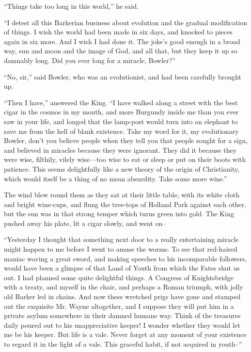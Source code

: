 \documentclass{book}
\begin{document}
“Things take too long in this world,” he said.

“I detest all this Barkerian business about evolution and the gradual modification of things. I wish the world had been made in six days, and knocked to pieces again in six more. And I wish I had done it. The joke’s good enough in a broad way, sun and moon and the image of God, and all that, but they keep it up so damnably long. Did you ever long for a miracle, Bowler?”

“No, sir,” said Bowler, who was an evolutionist, and had been carefully brought up.

“Then I have,” answered the King. “I have walked along a street with the best cigar in the cosmos in my mouth, and more Burgundy inside me than you ever saw in your life, and longed that the lamp-post would turn into an elephant to save me from the hell of blank existence. Take my word for it, my evolutionary Bowler, don’t you believe people when they tell you that people sought for a sign, and believed in miracles because they were ignorant. They did it because they were wise, filthily, vilely wise—too wise to eat or sleep or put on their boots with patience. This seems delightfully like a new theory of the origin of Christianity, which would itself be a thing of no mean absurdity. Take some more wine.”

The wind blew round them as they sat at their little table, with its white cloth and bright wine-cups, and flung the tree-tops of Holland Park against each other, but the sun was in that strong temper which turns green into gold. The King pushed away his plate, lit a cigar slowly, and went on–

“Yesterday I thought that something next door to a really entertaining miracle might happen to me before I went to amuse the worms. To see that red-haired maniac waving a great sword, and making speeches to his incomparable followers, would have been a glimpse of that Land of Youth from which the Fates shut us out. I had planned some quite delightful things. A Congress of Knightsbridge with a treaty, and myself in the chair, and perhaps a Roman triumph, with jolly old Barker led in chains. And now these wretched prigs have gone and stamped out the exquisite Mr. Wayne altogether, and I suppose they will put him in a private asylum somewhere in their damned humane way. Think of the treasures daily poured out to his unappreciative keeper! I wonder whether they would let me be his keeper. But life is a vale. Never forget at any moment of your existence to regard it in the light of a vale. This graceful habit, if not acquired in youth–”
\end{document}
